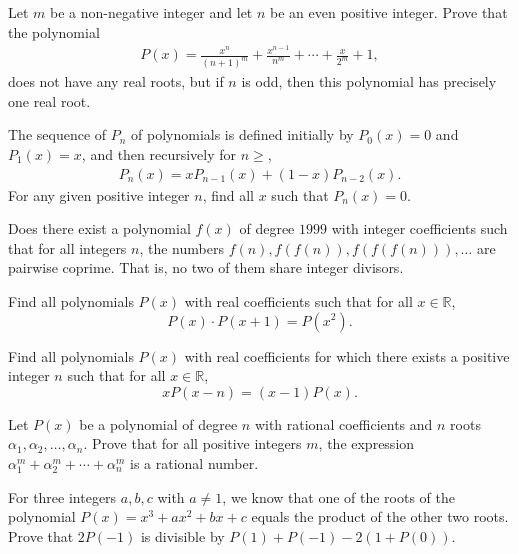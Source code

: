 \documentclass[12pt,a4paper]{memoir}
\theoremstyle{definition}
\begin{document}
\begin{question}
	Let $m$ be a non-negative integer and let $n$ be an even positive integer. Prove that the polynomial
	\begin{align*}
		P(x) = \frac{x^n}{(n+1)^m} + \frac{x^{n-1}}{n^m} + \cdots + \frac{x}{2^m} + 1,
	\end{align*}
	does not have any real roots, but if $n$ is odd, then this polynomial has precisely one real root.
\end{question}

\begin{question}[name={1996 Austrian--Polish}]
	The sequence of $P_n$ of polynomials is defined initially by $P_0(x)=0$ and $P_1(x)=x$, and then recursively for $n\geq$, 
	\begin{align*}
		P_n(x) = x P_{n-1}(x) + (1-x)P_{n-2}(x).
	\end{align*}
	For any given positive integer $n$, find all $x$ such that $P_n(x)=0$.
\end{question}

\begin{question}[name={2000 Iran}]
	Does there exist a polynomial $f(x)$ of degree $1999$ with integer coefficients such that for all integers $n$, the numbers $f(n), f(f(n)), f(f(f(n))), \dots$ are pairwise coprime. That is, no two of them share integer divisors.
\end{question}

\begin{question}
	Find all polynomials $P(x)$ with real coefficients such that for all $x\in \mathbb R$,
	\[P(x)\cdot P(x+1) = P(x^2).\]
\end{question}



\begin{question}[name={1999 Iran}]
	Find all polynomials $P(x)$ with real coefficients for which there exists a positive integer $n$ such that for all $x\in\mathbb R$,
	\[xP(x-n)=(x-1)P(x).\]
\end{question}

\begin{question}
	Let $P(x)$ be a polynomial of degree $n$ with rational coefficients and $n$ roots $\alpha_1,\alpha_2,\dots,\alpha_n$. Prove that for all positive integers $m$, the expression $\alpha_1^m+\alpha_2^m+\cdots+\alpha_n^m$ is a rational number.
\end{question}



\begin{question}[name={1997 Iran}]
	For three integers $a,b,c$ with $a\neq 1$, we know that one of the roots of the polynomial $P(x)=x^3+ax^2+bx+c$ equals the product of the other two roots. Prove that $2P(-1)$ is divisible by $P(1)+P(-1)-2(1+P(0))$.
\end{question}
\end{document}
